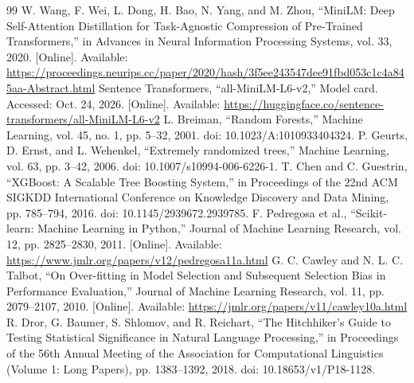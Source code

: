 \documentclass[journal]{IEEEtran}
\begin{document}
\begin{thebibliography}{99}
 W. Wang, F. Wei, L. Dong, H. Bao, N. Yang, and M. Zhou, ``MiniLM: Deep Self-Attention Distillation for Task-Agnostic Compression of Pre-Trained Transformers,'' in Advances in Neural Information Processing Systems, vol. 33, 2020. [Online]. Available: \url{https://proceedings.neurips.cc/paper/2020/hash/3f5ee243547dee91fbd053c1c4a845aa-Abstract.html}
 Sentence Transformers, ``all-MiniLM-L6-v2,'' Model card. Accessed: Oct. 24, 2026. [Online]. Available: \url{https://huggingface.co/sentence-transformers/all-MiniLM-L6-v2}
 L. Breiman, ``Random Forests,'' Machine Learning, vol. 45, no. 1, pp. 5--32, 2001. doi: 10.1023/A:1010933404324.
 P. Geurts, D. Ernst, and L. Wehenkel, ``Extremely randomized trees,'' Machine Learning, vol. 63, pp. 3--42, 2006. doi: 10.1007/s10994-006-6226-1.
 T. Chen and C. Guestrin, ``XGBoost: A Scalable Tree Boosting System,'' in Proceedings of the 22nd ACM SIGKDD International Conference on Knowledge Discovery and Data Mining, pp. 785--794, 2016. doi: 10.1145/2939672.2939785.
 F. Pedregosa et al., ``Scikit-learn: Machine Learning in Python,'' Journal of Machine Learning Research, vol. 12, pp. 2825--2830, 2011. [Online]. Available: \url{https://www.jmlr.org/papers/v12/pedregosa11a.html}
 G. C. Cawley and N. L. C. Talbot, ``On Over-fitting in Model Selection and Subsequent Selection Bias in Performance Evaluation,'' Journal of Machine Learning Research, vol. 11, pp. 2079--2107, 2010. [Online]. Available: \url{https://jmlr.org/papers/v11/cawley10a.html}
 R. Dror, G. Baumer, S. Shlomov, and R. Reichart, ``The Hitchhiker's Guide to Testing Statistical Significance in Natural Language Processing,'' in Proceedings of the 56th Annual Meeting of the Association for Computational Linguistics (Volume 1: Long Papers), pp. 1383--1392, 2018. doi: 10.18653/v1/P18-1128.
\end{thebibliography}
\end{document}

